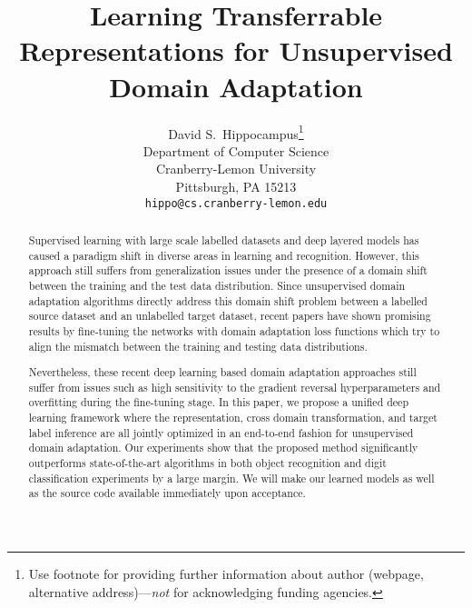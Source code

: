 \documentclass{article}
\title{Learning Transferrable Representations for Unsupervised Domain Adaptation}
\author{
  David S.~Hippocampus\thanks{Use footnote for providing further
    information about author (webpage, alternative
    address)---\emph{not} for acknowledging funding agencies.} \\
  Department of Computer Science\\
  Cranberry-Lemon University\\
  Pittsburgh, PA 15213 \\
  \texttt{hippo@cs.cranberry-lemon.edu} \\
}
\begin{document}
 

\maketitle

\begin{abstract} 
Supervised learning with large scale labelled datasets and deep layered models has caused a paradigm shift in diverse areas in learning and recognition. However, this approach still suffers from generalization issues under the presence of a domain shift between the training and the test data distribution. Since unsupervised domain adaptation algorithms directly address this domain shift problem between a labelled source dataset and an unlabelled target dataset, recent papers \cite{ganin15, tzeng14} have shown promising results by fine-tuning the networks with domain adaptation loss functions which try to align the mismatch between the training and testing data distributions.

Nevertheless, these recent deep learning based domain adaptation approaches still suffer from issues such as high sensitivity to the gradient reversal hyperparameters \cite{ganin15} and overfitting during the fine-tuning stage. In this paper, we propose a unified deep learning framework where the representation, cross domain transformation, and target label inference are all jointly optimized in an end-to-end fashion for unsupervised domain adaptation. Our experiments show that the proposed method significantly outperforms state-of-the-art algorithms in both object recognition and digit classification experiments by a large margin. We will make our learned models as well as the source code available immediately upon acceptance.
\end{abstract} 
\end{document}
